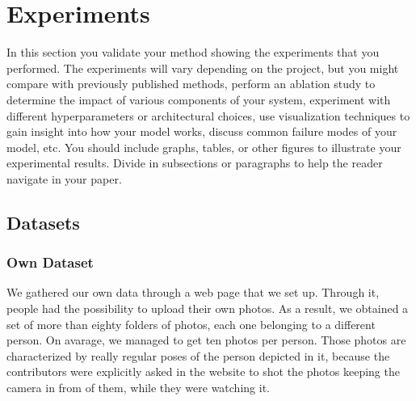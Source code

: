 \section{Experiments}
In this section you validate your method showing the experiments that you performed. The experiments will vary depending on the project, but you might compare with previously published methods, perform an ablation study to determine the impact of various components of your system, experiment with different hyperparameters or architectural choices, use visualization techniques to gain insight into how your model works, discuss common failure modes of your model, etc. You should include graphs, tables, or other figures to illustrate your experimental results. Divide in subsections or paragraphs to help the reader navigate in your paper.

\subsection{Datasets}
\subsubsection{Own Dataset}
We gathered our own data through a web page \cite{gdpdataret} that we set up. Through it, people had the possibility to upload their own photos. As a result, we obtained a set of more than eighty folders of photos, each one belonging to a different person. On avarage, we managed to get ten photos per person. Those photos are characterized by really regular poses of the person depicted in it, because the contributors were explicitly asked in the website to shot the photos keeping the camera in from of them, while they were watching it.
